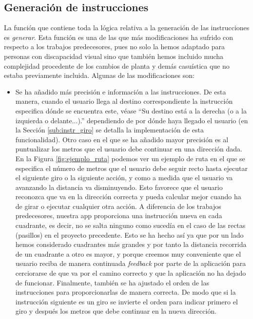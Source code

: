 \subsection{Generación de instrucciones}
\label{sub:genInstruc}

La función que contiene toda la lógica relativa a la generación de las instrucciones es \textit{generar}. Esta función es una de las que más modificaciones ha sufrido con respecto a los trabajos predecesores, pues no solo la hemos adaptado para personas con discapacidad visual sino que también hemos incluido mucha complejidad procedente de los cambios de planta y demás casuística que no estaba previamente incluida. Algunas de las modificaciones son: 

\begin{itemize}
	\item Se ha añadido más precisión e información a las instrucciones. De esta manera, cuando el usuario llega al destino correspondiente la instrucción especifica dónde se encuentra este, véase ``Su destino está a la derecha (o a la izquierda o delante...).'' dependiendo de por dónde haya llegado el usuario (en la Sección \ref{sub:instr_giro} se detalla la implementación de esta funcionalidad). Otro caso en el que se ha añadido mayor precisión es al puntualizar los metros que el usuario debe continuar en una dirección dada. En la Figura \ref{fig:ejemplo_ruta} podemos ver un ejemplo de ruta en el que se especifica el número de metros que el usuario debe seguir recto hasta ejecutar el siguiente giro o la siguiente acción, y como a medida que el usuario va avanzando la distancia va disminuyendo. Esto favorece que el usuario reconozca que va en la dirección correcta y pueda calcular mejor cuando ha de girar o ejecutar cualquier otra acción. A diferencia de los trabajos predecesores, nuestra app proporciona una instrucción nueva en cada cuadrante, es decir, no se salta ninguno como sucedía en el caso de las rectas (pasillos) en el proyecto precedente. Esto se ha hecho así ya que por un lado hemos considerado cuadrantes más grandes y por tanto la distancia recorrida de un cuadrante a otro es mayor, y porque creemos muy conveniente que el usuario reciba de manera continuada \textit{feedback} por parte de la aplicación para cerciorarse de que va por el camino correcto y que la aplicación no ha dejado de funcionar. Finalmente, también se ha ajustado el orden de las instrucciones para proporcionarlas de manera correcta. De modo que si la instrucción siguiente es un giro se invierte el orden para indicar primero el giro y después los metros que debe continuar en la nueva dirección.
	

\end{itemize}
